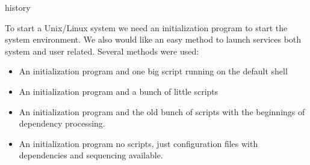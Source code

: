 \begin{frame} {history}

        To start a Unix/Linux system we need an initialization program
        to start the system environment. We also would like an easy
        method to launch services both system and user
        related. Several methods were used:

        \begin{itemize}
        \item An initialization program and one
                big script running on the default shell
        \item An initialization program and a bunch of little scripts
        \item An initialization program and the old bunch of scripts
                        with the beginnings of
                        dependency processing.
        \item An initialization program no scripts, just configuration files
                with dependencies and sequencing available.
        \end{itemize}


\end{frame}

\cprotect\note{


}


